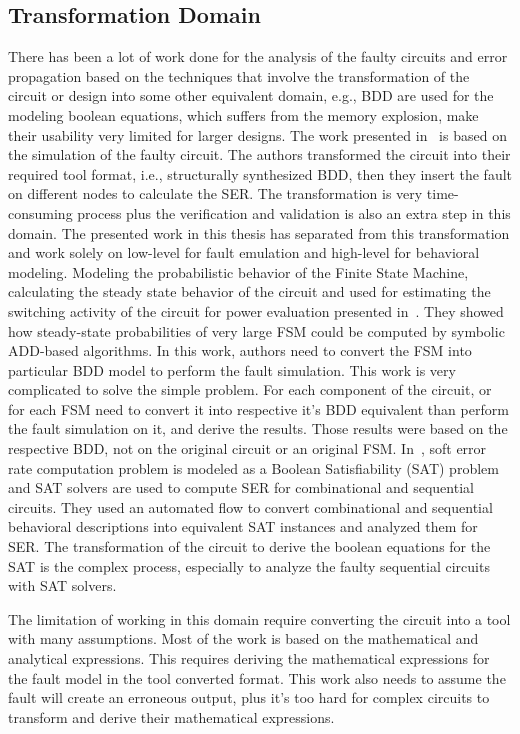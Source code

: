 \subsection{Transformation Domain}
There has been a lot of work done for the analysis of the faulty circuits and error propagation based on the techniques that involve the transformation of the circuit or design into some other equivalent domain, e.g., BDD are used for the modeling boolean equations, which suffers from the memory explosion, make their usability very limited for larger designs.
The work presented in~\citep{ubar2014modeling} is based on the simulation of the faulty circuit.  The authors transformed the circuit into their required tool format, i.e., structurally synthesized BDD, then they
insert the fault on different nodes to calculate the SER.  The transformation is very time-consuming process plus the verification and validation is also an extra step in this domain. The presented work in this thesis has separated from this transformation and work solely on low-level for fault emulation and high-level for behavioral modeling.
Modeling the probabilistic behavior of the Finite State Machine, calculating the steady state
behavior of the circuit and used for estimating the switching activity of the circuit for
power evaluation presented in~\citep{hachtel1996markovian}. They showed how steady-state probabilities of very large FSM could be computed by
symbolic ADD-based algorithms. In this work, authors need to convert the FSM into particular BDD model to perform the fault simulation. This work is very complicated to solve the simple problem.  For each component of the circuit, or for each FSM need to convert it into respective it's BDD equivalent than perform the fault simulation on it, and derive the results. Those results were based on the respective BDD, not on the original circuit or an original FSM.
In~\citep{shazli2011high}, soft error rate  computation problem is modeled as a Boolean
Satisfiability (SAT) problem and SAT solvers are used to compute SER for combinational and
sequential circuits. They used an automated flow to convert combinational and sequential behavioral
descriptions into equivalent SAT instances and analyzed them for SER. The transformation of the circuit to derive the boolean equations for the SAT is the complex process, especially to analyze the faulty sequential circuits with SAT solvers.

The limitation of working in this domain require converting the circuit into a tool with many assumptions. Most of the work is based on the mathematical and analytical expressions. This requires deriving the mathematical expressions for the fault model in the tool converted format. This work also needs to assume the fault will create an erroneous output, plus it’s too hard for complex circuits to transform and derive their mathematical expressions.
